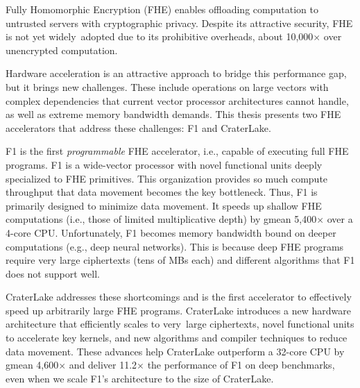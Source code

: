 Fully Homomorphic Encryption (FHE) enables offloading computation to untrusted
servers with cryptographic privacy. Despite its attractive security, FHE is not
yet widely~adopted due to its prohibitive overheads, about 10,000$\times$ over
unencrypted computation.

Hardware acceleration is an attractive approach to bridge this performance gap,
but it brings new challenges. These include operations on large vectors with
complex dependencies that current vector processor architectures cannot handle,
as well as extreme memory bandwidth demands. This thesis presents two FHE
accelerators that address these challenges: F1 and CraterLake.

F1 is the first \emph{programmable} FHE accelerator, i.e., capable of executing
full FHE programs. F1 is a wide-vector processor with novel functional units
deeply specialized to FHE primitives. This organization provides so much compute
throughput that data movement becomes the key bottleneck. Thus, F1 is primarily
designed to minimize data movement. It speeds up shallow FHE computations
(i.e., those of limited multiplicative depth) by gmean 5,400$\times$ over a
4-core CPU. Unfortunately, F1 becomes memory bandwidth bound on deeper
computations (e.g., deep neural networks). This is because deep FHE programs
require very large ciphertexts (tens of MBs each) and different algorithms that
F1 does not support well.

CraterLake addresses these shortcomings and is the first accelerator to
effectively speed up arbitrarily large FHE programs.  CraterLake introduces a
new hardware architecture that efficiently scales to very~large ciphertexts,
novel functional units to accelerate key kernels, and new algorithms and
compiler techniques to reduce data movement. These advances help CraterLake
outperform a 32-core CPU by gmean 4,600$\times$ and deliver 11.2$\times$ the
performance of F1 on deep benchmarks, even when we scale F1's architecture to
the size of CraterLake.

